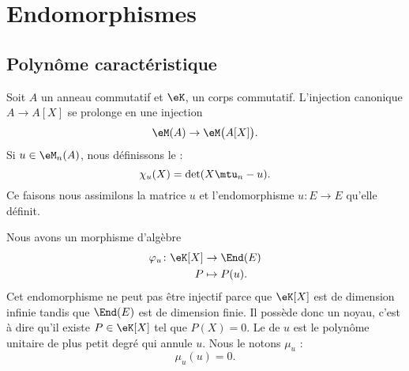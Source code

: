 \section{Endomorphismes}

\subsection{Polynôme caractéristique}

Soit \( A\) un anneau commutatif et \( \eK\), un corps commutatif. L'injection canonique \( A\to A[X]\) se prolonge en une injection
\begin{equation}
   \eM(A)\to\eM\big( A[X] \big).
\end{equation}
Si \( u\in\eM_n(A)\), nous définissons le  :
\begin{equation}
    \chi_u(X)=\det(X\mtu_n-u).
\end{equation} 
Ce faisons nous assimilons la matrice \( u\) et l'endomorphisme \( u\colon E\to E\) qu'elle définit. 

Nous avons un morphisme d'algèbre
\begin{equation}
    \begin{aligned}
        \varphi_u\colon\eK[X]&\to \End(E) \\
        P&\mapsto P(u). 
    \end{aligned}
\end{equation}
Cet endomorphisme ne peut pas être injectif parce que \(\eK[X]\) est de dimension infinie tandis que \( \End(E)\) est de dimension finie. Il possède donc un noyau, c'est à dire qu'il existe \( P\in\eK[X]\) tel que \( P(X)=0\). Le  de \( u\) est le polynôme unitaire de plus petit degré qui annule \( u\). Nous le notons \( \mu_u\) :
\begin{equation}
    \mu_u(u)=0.
\end{equation}


